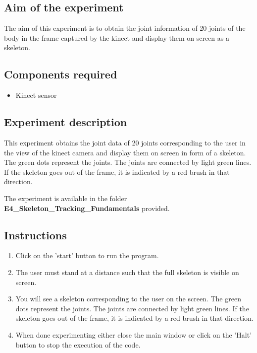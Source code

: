 \begin{flushleft}
\medskip
\subsection{\textbf{ Aim of the experiment}}
The aim of this experiment is to obtain the joint information of 20 joints of the body in the frame captured by the kinect and display them on screen as a skeleton.
\medskip

\subsection{\textbf{ Components required}}
\begin{itemize}
\item Kinect sensor
\end{itemize}
\medskip

\subsection{\textbf{ Experiment description}}
This experiment obtains the joint data of 20 joints corresponding to the user in the view of the kinect camera and display them on screen in form of a skeleton. The green dots represent the joints. The joints are connected by light green lines. If the skeleton goes out of the frame, it is indicated by a red brush in that direction.

\medskip
The experiment is available in the folder \textbf{E4\_Skeleton\_Tracking\_Fundamentals} provided.
\medskip

\subsection{\textbf{ Instructions}}
\begin{enumerate}
\item Click on the 'start' button to run the program.
\item The user must stand at a distance such that the full skeleton is visible on screen.
\item You will see a skeleton corresponding to the user on the screen. The green dots represent the joints. The joints are connected by light green lines. If the skeleton goes out of the frame, it is indicated by a red brush in that direction.
\item When done experimenting either close the main window or click on the 'Halt' button to stop the execution of the code.
\end{enumerate}
\medskip

\end{flushleft}
